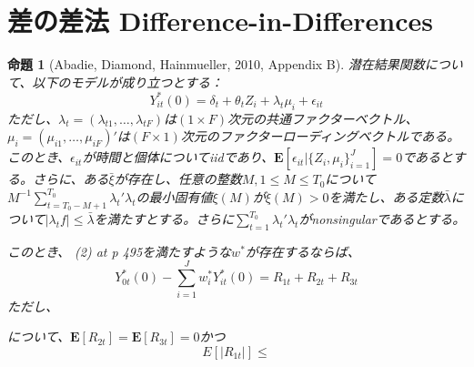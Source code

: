\documentclass[a4paper]{bxjsarticle}
\newtheorem{prop}{命題}
\begin{document}
\section{差の差法 Difference-in-Differences}
\begin{prop}[Abadie, Diamond, Hainmueller, 2010, Appendix B]
潜在結果関数について、以下のモデルが成り立つとする：
\[
 Y^*_{it}(0) = \delta_t + \theta_t Z_i + \lambda_t \mu_i + \epsilon_{it}
\]
ただし、$\lambda_t = (\lambda_{t1},\ldots, \lambda_{tF})$は$(1\times F)$次元の共通ファクターベクトル、$\mu_i = (\mu_{i1},\ldots, \mu_{iF})'$は$(F \times 1)$次元のファクターローディングベクトルである。このとき、$\epsilon_{it}$が時間と個体についてiidであり、$\mathbf{E}[\epsilon_{it}|\{Z_i,\mu_i\}_{i=1}^J] = 0$であるとする。さらに、ある$\bar{\xi}$が存在し、任意の整数$M, 1 \leq M \leq T_0$について$M^{-1}\sum_{t=T_0-M+1}^{T_0} \lambda_t' \lambda_t$の最小固有値$\xi(M)$が$\xi(M) > 0$を満たし、ある定数$\bar{\lambda}$について$|\lambda_tf| \leq \bar{\lambda}$を満たすとする。さらに$\sum_{t=1}^{T_0} \lambda_t' \lambda_t$がnonsingularであるとする。

このとき、 (2) at p 495を満たすような$w^*$が存在するならば、
\[
 Y_{0t}^*(0) - \sum_{i=1}^J w_i^* Y_{it}^*(0) = R_{1t} + R_{2t} + R_{3t}
\]
ただし、

について、$\mathbf{E}[R_{2t}] = \mathbf{E}[R_{3t}] = 0$かつ
\[
E[|R_{1t}|] \leq 
\]

    
\end{prop}
\end{document}
